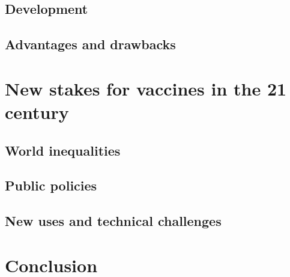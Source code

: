\documentclass{article}
\begin{document}
        \subsection{Development}

        \subsection{Advantages and drawbacks}

    \section{New stakes for vaccines in the 21 century}

        \subsection{World inequalities}

        \subsection{Public policies}

        \subsection{New uses and technical challenges}

    \section{Conclusion}




\end{document}
